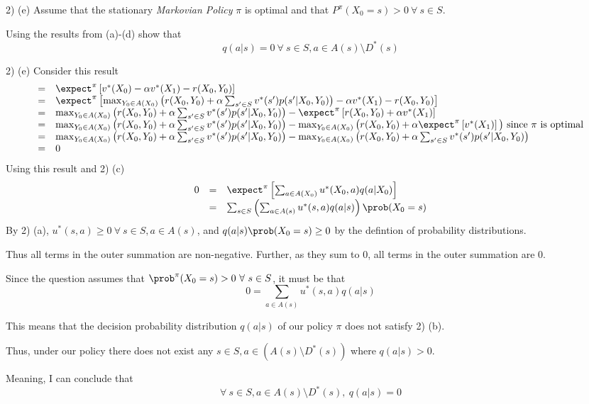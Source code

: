 \documentclass[11pt,a4paper]{article}
\begin{document}
\begin{question}{2) (e)}
  Assume that the stationary \textit{Markovian Policy} $\pi$ is optimal and that $P^\pi(X_0=s)>0\ \forall\ s\in S$.
  \par Using the results from (a)-(d) show that
  \[ q(a|s)=0\ \forall \ s\in S,a\in A(s)\setminus D^*(s)\]
\end{question}

\begin{answer}{2) (e)}
  Consider this result
  \[\begin{array}{rl}
    =&\expect^\pi\left[v^*(X_0)-\alpha v^*(X_1)-r(X_0,Y_0)\right]\\
    =&\expect^\pi\left[\max_{Y_0\in A(X_0)}\left(r(X_0,Y_0)+\alpha\sum_{s'\in S}v^*(s')p(s'|X_0,Y_0)\right)-\alpha v^*(X_1)-r(X_0,Y_0)\right]\\
    =&\max_{Y_0\in A(X_0)}\left(r(X_0,Y_0)+\alpha\sum_{s'\in S}v^*(s')p(s'|X_0,Y_0)\right)-\expect^\pi\left[r(X_0,Y_0)+\alpha v^*(X_1)\right]\\
    =&\max_{Y_0\in A(X_0)}\left(r(X_0,Y_0)+\alpha\sum_{s'\in S}v^*(s')p(s'|X_0,Y_0)\right)-\max_{Y_0\in A(X_0)}\big(r(X_0,Y_0)+\alpha\expect^\pi\left[ v^*(X_1)\right]\big)\text{ since }\pi\text{ is optimal}\\
    =&\max_{Y_0\in A(X_0)}\left(r(X_0,Y_0)+\alpha\sum_{s'\in S}v^*(s')p(s'|X_0,Y_0)\right)-\max_{Y_0\in A(X_0)}\left(r(X_0,Y_0)+\alpha\sum_{s'\in S}v^*(s')p(s'|X_0,Y_0)\right)\\
    =&0
  \end{array}\]
  Using this result and 2) (c)
  \[\begin{array}{rcl}
    0&=&\expect^\pi\left[\sum_{a\in A(X_0)}u^*(X_0,a)q(a|X_0)\right]\\
    &=&\sum_{s\in S}\left(\sum_{a\in A(s)}u^*(s,a)q(a|s)\right)\prob(X_0=s)
  \end{array}\]
  By 2) (a), $u^*(s,a)\geq0\ \forall\ s\in S,a\in A(s)$, and $q(a|s)\prob(X_0=s)\geq0$ by the defintion of probability distributions.
  \par Thus all terms in the outer summation are non-negative. Further, as they sum to 0, all terms in the outer summation are 0.
  \par Since the question assumes that $\prob^\pi(X_0=s)>0\ \forall\ s\in S$, it must be that
  \[ 0=\sum_{a\in A(s)}u^*(s,a)q(a|s) \]
  \par This means that the decision probability distribution $q(a|s)$ of our policy $\pi$ does not satisfy 2) (b).
  \par Thus, under our policy there does not exist any $s\in S,a\in(A(s)\setminus D^*(s))$ where $q(a|s)>0$.
  \par Meaning, I can conclude that
  \[ \forall\ s\in S, a\in A(s)\setminus D^*(s),\ q(a|s)=0 \]
  \proved
\end{answer}
\end{document}

